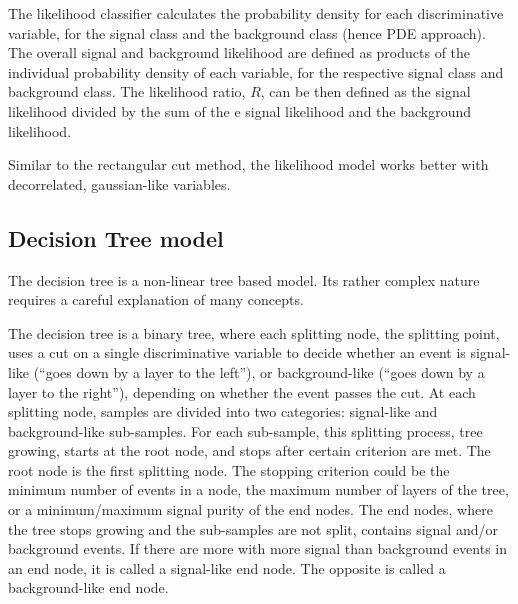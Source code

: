 The likelihood classifier calculates the probability density for each discriminative variable, for the signal class and the  background class (hence PDE approach). The overall signal and background likelihood are defined as products of the individual probability density of each variable, for the respective signal class and background class. The likelihood ratio, $R$, can be then defined as the signal likelihood divided by the sum of the e signal likelihood and the background likelihood.



Similar to the rectangular cut method, the likelihood model works better with decorrelated, gaussian-like variables.



\subsection{Decision Tree model}
\label{sec:pandoraDecisionTree}


The decision tree is a non-linear tree based model. Its rather complex nature requires a careful explanation of many concepts.

The decision tree is a binary tree, where each splitting node, the splitting point, uses a cut on a single discriminative variable to decide whether an event is signal-like (``goes down by a layer to the left''), or background-like (``goes down by a layer to the right''), depending on whether the event passes the cut. At each splitting node, samples are divided into two categories: signal-like and background-like sub-samples. For each sub-sample, this splitting process, tree growing, starts at the  root node, and stops after certain criterion are met. The root node is the first splitting node. The stopping criterion could be the minimum number of events in a node, the maximum number of layers of the tree, or a minimum/maximum signal purity of the end nodes.  The end nodes, where the tree stops growing and the sub-samples are not split, contains signal and/or background events. If there are more with more signal than background events in an end node, it is called a signal-like end node. The opposite is called a background-like end node.

